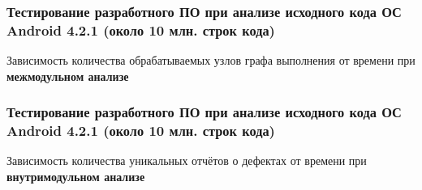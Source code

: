 \documentclass[hyperref={pdfpagelabels=false},10pt]{beamer}
\begin{document}
\begin{frame}
\frametitle{Тестирование разработного ПО при анализе исходного кода ОС Android 4.2.1 (около 10 млн. строк кода)}
Зависимость количества обрабатываемых узлов графа выполнения от времени  при \textbf{межмодульном анализе}
\begin{figure}[h]
\end{figure}
\end{frame}

\begin{frame}
\frametitle{Тестирование разработного ПО при анализе исходного кода ОС Android 4.2.1 (около 10 млн. строк кода)}
Зависимость количества уникальных отчётов о дефектах от времени  при \textbf{внутримодульном анализе}
\begin{figure}[h]
\end{figure}
\end{frame}
\end{document}
